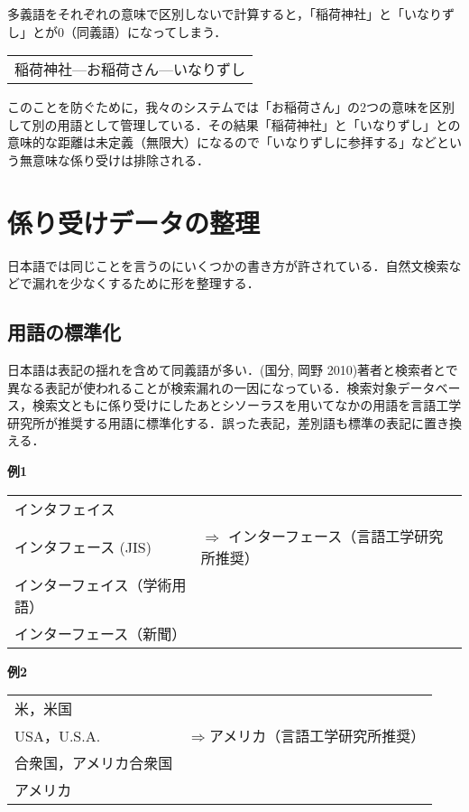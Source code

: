 \documentclass[japanese]{jnlp_1.4}
\begin{document}
多義語をそれぞれの意味で区別しないで計算すると，「稲荷神社」と「いなりずし」とが0（同義語）になってしまう．

\vspace{0.3zw}
\begin{tabular}{l}
稲荷神社—お稲荷さん—いなりずし
\end{tabular}
\vspace{0.3zw}

このことを防ぐために，我々のシステムでは「お稲荷さん」の2つの意味を区別して別の用語として管理している．その結果「稲荷神社」と「いなりずし」との意味的な距離は未定義（無限大）になるので「いなりずしに参拝する」などという無意味な係り受けは排除される．




\section{係り受けデータの整理}

日本語では同じことを言うのにいくつかの書き方が許されている．自然文検索などで漏れを少なくするために形を整理する．


\subsection{用語の標準化}

日本語は表記の揺れを含めて同義語が多い．(国分, 岡野 2010)著者と検索者とで異なる表記が使われることが検索漏れの一因になっている．検索対象データベース，検索文ともに係り受けにしたあとシソーラスを用いてなかの用語を言語工学研究所が推奨する用語に標準化する．誤った表記，差別語も標準の表記に置き換える．

{\bfseries 例1}

\vspace{0.3zw}
\begin{tabular}{ll}
インタフェイス \\
インタフェース (JIS) & $\Longrightarrow$ インターフェース（言語工学研究所推奨） \\
インターフェイス（学術用語）& \\
インターフェース（新聞）& 
\end{tabular}
\vspace{0.3zw}

{\bfseries 例2}

\vspace{0.3zw}
\begin{tabular}{ll}
米，米国 \\
USA，U.S.A. & $\Longrightarrow$アメリカ（言語工学研究所推奨） \\
合衆国，アメリカ合衆国 & \\
アメリカ &
\end{tabular}
\vspace{0.3zw}
\end{document}

